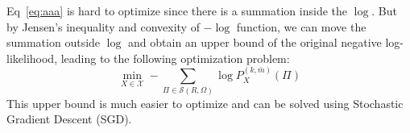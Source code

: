 \documentclass{article}
\begin{document}
Eq~\eqref{eq:aaa} is hard to optimize since there is a summation inside the $\log$. 
But by Jensen's inequality and convexity of $-\log$ function, we can move the summation outside $\log$ and obtain an upper bound of the original negative log-likelihood, leading to the following optimization problem: 
\begin{equation}
\min_{X \in \mathcal X} -\sum_{\Pi \in \mathcal S (R, \Omega)} \log P_X^{(k, \bar{m})}(\Pi)
    \label{eq:convex}
\end{equation}
This upper bound is much easier to optimize and can be solved using Stochastic Gradient Descent (SGD). 
\end{document}
